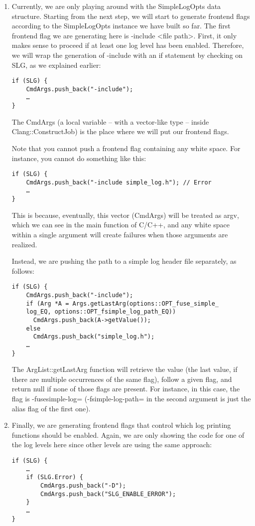 \begin{enumerate}
\item Currently, we are only playing around with the SimpleLogOpts data structure. Starting from the next step, we will start to generate frontend flags according to the SimpleLogOpts instance we have built so far. The first frontend flag we are generating here is -include <file path>. First, it only makes sense to proceed if at least one log level has been enabled. Therefore, we will wrap the generation of -include with an if statement by checking on SLG, as we explained earlier:

\begin{lstlisting}[style=styleCXX]
if (SLG) {
	CmdArgs.push_back("-include");
	…
}
\end{lstlisting}

The CmdArgs (a local variable – with a vector-like type – inside Clang::ConstructJob) is the place where we will put our frontend flags.

Note that you cannot push a frontend flag containing any white space. For instance, you cannot do something like this:

\begin{lstlisting}[style=styleCXX]
if (SLG) {
	CmdArgs.push_back("-include simple_log.h"); // Error
	…
}
\end{lstlisting}

This is because, eventually, this vector (CmdArgs) will be treated as argv, which we can see in the main function of C/C++, and any white space within a single argument will create failures when those arguments are realized.

Instead, we are pushing the path to a simple log header file separately, as follows:

\begin{lstlisting}[style=styleCXX]
if (SLG) {
	CmdArgs.push_back("-include");
	if (Arg *A = Args.getLastArg(options::OPT_fuse_simple_
	log_EQ, options::OPT_fsimple_log_path_EQ))
 	  CmdArgs.push_back(A->getValue());
	else
	  CmdArgs.push_back("simple_log.h");
	…
}
\end{lstlisting}

The ArgList::getLastArg function will retrieve the value (the last value, if there are multiple occurrences of the same flag), follow a given flag, and return null if none of those flags are present. For instance, in this case, the flag is -fusesimple-log= (-fsimple-log-path= in the second argument is just the alias flag of the first one).

\item Finally, we are generating frontend flags that control which log printing functions should be enabled. Again, we are only showing the code for one of the log levels here since other levels are using the same approach:

\begin{lstlisting}[style=styleCXX]
if (SLG) {
	…
	if (SLG.Error) {
		CmdArgs.push_back("-D");
		CmdArgs.push_back("SLG_ENABLE_ERROR");
	}
	…
}
\end{lstlisting}

\end{enumerate}

